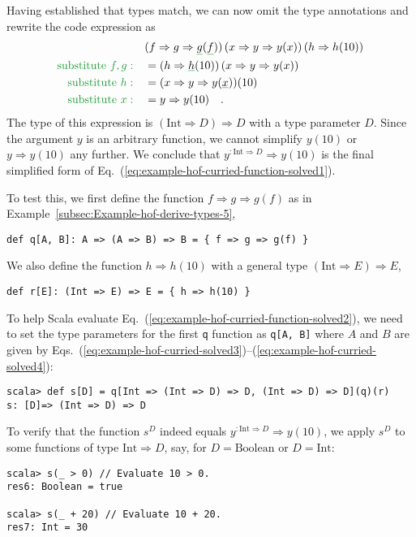 Having established that types match, we can now omit the type annotations
and rewrite the code expression as
\begin{align*}
 & (f\Rightarrow g\Rightarrow\gunderline g(\gunderline f))\left(x\Rightarrow y\Rightarrow y(x)\right)\left(h\Rightarrow h(10)\right)\\
{\color{greenunder}\text{substitute }f,g:}\quad & =(h\Rightarrow\gunderline h(10))\left(x\Rightarrow y\Rightarrow y(x)\right)\\
{\color{greenunder}\text{substitute }h:}\quad & =(x\Rightarrow y\Rightarrow y(\gunderline x))(10)\\
{\color{greenunder}\text{substitute }x:}\quad & =y\Rightarrow y(10)\quad.
\end{align*}
The type of this expression is $\left(\text{Int}\Rightarrow D\right)\Rightarrow D$
with a type parameter $D$. Since the argument $y$ is an arbitrary
function, we cannot simplify $y(10)$ or $y\Rightarrow y(10)$ any
further. We conclude that $y^{:\text{Int}\Rightarrow D}\Rightarrow y(10)$
is the final simplified form of Eq.~(\ref{eq:example-hof-curried-function-solved1}).

To test this, we first define the function $f\Rightarrow g\Rightarrow g(f)$
as in Example~\ref{subsec:Example-hof-derive-types-5},
\begin{lstlisting}
def q[A, B]: A => (A => B) => B = { f => g => g(f) }
\end{lstlisting}
We also define the function $h\Rightarrow h(10)$ with a general type
$\left(\text{Int}\Rightarrow E\right)\Rightarrow E$,
\begin{lstlisting}
def r[E]: (Int => E) => E = { h => h(10) }
\end{lstlisting}
To help Scala evaluate Eq.~(\ref{eq:example-hof-curried-function-solved2}),
we need to set the type parameters for the first \lstinline!q!
function as \lstinline!q[A, B]!
where $A$ and $B$ are given by Eqs.~(\ref{eq:example-hof-curried-solved3})–(\ref{eq:example-hof-curried-solved4}):
\begin{lstlisting}
scala> def s[D] = q[Int => (Int => D) => D, (Int => D) => D](q)(r)
s: [D]=> (Int => D) => D
\end{lstlisting}
To verify that the function $s^{D}$ indeed equals $y^{:\text{Int}\Rightarrow D}\Rightarrow y(10)$,
we apply $s^{D}$ to some functions of type $\text{Int}\Rightarrow D$,
say, for $D=\text{Boolean}$ or $D=\text{Int}$:
\begin{lstlisting}
scala> s(_ > 0) // Evaluate 10 > 0.
res6: Boolean = true

scala> s(_ + 20) // Evaluate 10 + 20.
res7: Int = 30
\end{lstlisting}

